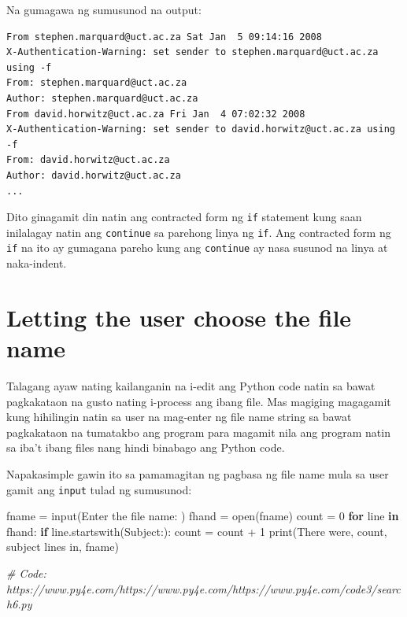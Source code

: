 \documentclass[10pt,]{book}
\newenvironment{Shaded}{}{}
\newcommand{\BuiltInTok}[1]{\textcolor[rgb]{0.00,0.50,0.00}{#1}}
\newcommand{\CommentTok}[1]{\textcolor[rgb]{0.38,0.63,0.69}{\textit{#1}}}
\newcommand{\ControlFlowTok}[1]{\textcolor[rgb]{0.00,0.44,0.13}{\textbf{#1}}}
\newcommand{\DecValTok}[1]{\textcolor[rgb]{0.25,0.63,0.44}{#1}}
\newcommand{\KeywordTok}[1]{\textcolor[rgb]{0.00,0.44,0.13}{\textbf{#1}}}
\newcommand{\NormalTok}[1]{#1}
\newcommand{\OperatorTok}[1]{\textcolor[rgb]{0.40,0.40,0.40}{#1}}
\newcommand{\StringTok}[1]{\textcolor[rgb]{0.25,0.44,0.63}{#1}}
\begin{document}
Na gumagawa ng sumusunod na output:

{\small
\begin{verbatim}
From stephen.marquard@uct.ac.za Sat Jan  5 09:14:16 2008
X-Authentication-Warning: set sender to stephen.marquard@uct.ac.za using -f
From: stephen.marquard@uct.ac.za
Author: stephen.marquard@uct.ac.za
From david.horwitz@uct.ac.za Fri Jan  4 07:02:32 2008
X-Authentication-Warning: set sender to david.horwitz@uct.ac.za using -f
From: david.horwitz@uct.ac.za
Author: david.horwitz@uct.ac.za
...
\end{verbatim}
}

Dito ginagamit din natin ang contracted form ng \texttt{if} statement
kung saan inilalagay natin ang \texttt{continue} sa parehong linya ng
\texttt{if}. Ang contracted form ng \texttt{if} na ito ay gumagana
pareho kung ang \texttt{continue} ay nasa susunod na linya at
naka-indent.

\section{Letting the user choose the file
name}\label{letting-the-user-choose-the-file-name}

Talagang ayaw nating kailanganin na i-edit ang Python code natin sa
bawat pagkakataon na gusto nating i-process ang ibang file. Mas magiging
magagamit kung hihilingin natin sa user na mag-enter ng file name string
sa bawat pagkakataon na tumatakbo ang program para magamit nila ang
program natin sa iba't ibang files nang hindi binabago ang Python code.

Napakasimple gawin ito sa pamamagitan ng pagbasa ng file name mula sa
user gamit ang \texttt{input} tulad ng sumusunod:

\begin{Shaded}
\begin{Highlighting}[]
\NormalTok{fname }\OperatorTok{=} \BuiltInTok{input}\NormalTok{(}\StringTok{\textquotesingle{}Enter the file name: \textquotesingle{}}\NormalTok{)}
\NormalTok{fhand }\OperatorTok{=} \BuiltInTok{open}\NormalTok{(fname)}
\NormalTok{count }\OperatorTok{=} \DecValTok{0}
\ControlFlowTok{for}\NormalTok{ line }\KeywordTok{in}\NormalTok{ fhand:}
    \ControlFlowTok{if}\NormalTok{ line.startswith(}\StringTok{\textquotesingle{}Subject:\textquotesingle{}}\NormalTok{):}
\NormalTok{        count }\OperatorTok{=}\NormalTok{ count }\OperatorTok{+} \DecValTok{1}
\BuiltInTok{print}\NormalTok{(}\StringTok{\textquotesingle{}There were\textquotesingle{}}\NormalTok{, count, }\StringTok{\textquotesingle{}subject lines in\textquotesingle{}}\NormalTok{, fname)}

\CommentTok{\# Code: https://www.py4e.com/https://www.py4e.com/https://www.py4e.com/code3/search6.py}
\end{Highlighting}
\end{Shaded}
\end{document}

